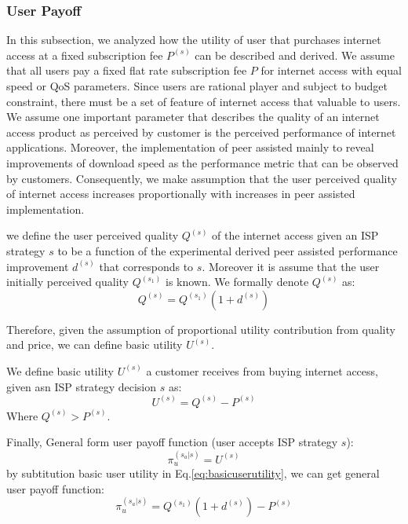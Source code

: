 \documentclass[paper]{ieice}
\begin{document}
\subsubsection{User Payoff}
In this subsection, we  analyzed how the utility of user that purchases internet access at a fixed subscription fee $P^{(s)}$ can be described and derived. 
We assume that all users pay a fixed flat rate subscription fee $P$ for internet access with equal speed or QoS parameters.
Since users are rational player and subject to budget constraint, there must be a set of feature of internet access that valuable to users.
We assume one important parameter that describes the quality of an internet access product as perceived by customer is the perceived performance of internet applications.  
Moreover, the implementation of peer assisted mainly to reveal improvements of download speed as the performance metric that can be observed by customers.
Consequently, we make assumption that the user perceived quality of internet access increases proportionally with increases in peer assisted implementation. 

\newtheorem{theorem8}{Definition}
\begin{theorem}
we define the user perceived quality $Q^{(s)}$ of the internet access given an ISP strategy $s$ to be a function of the experimental derived peer assisted performance improvement $d^{(s)}$ that corresponds to $s$. 
Moreover it is assume that the user initially perceived quality $Q^{(s_1)}$ is known. 
We formally denote $Q^{(s)}$ as:
\begin{equation}\label{eq:basicuserutility}
	Q^{(s)} = Q^{(s_1)} (1 + d^{(s)})
\end{equation}
\end{theorem}

Therefore, given the assumption of proportional utility contribution from quality and price, we can define basic utility $U^{(s)}$. 

\newtheorem{theorem9}{Definition}
\begin{theorem}
We define basic utility $U^{(s)}$ a customer receives from buying internet access, given asn ISP strategy decision $s$ as:
\begin{equation}
	U^{(s)} = Q^{(s)} - P^{(s)}
\end{equation}
Where $Q^{(s)} > P^{(s)}$.
\end{theorem}

Finally, General form user payoff function (user accepts ISP strategy $s$):
\begin{equation}
	\pi^{(s_a | s)}_u = U^{(s)}
\end{equation}
by subtitution basic user utility in Eq.\ref{eq:basicuserutility}, we can get general user payoff function:
\begin{equation}
	\pi^{(s_a | s)}_u  = Q^{(s_1)} ( 1 + d^{(s)}) - P^{(s)}	
\end{equation}
\end{document}
